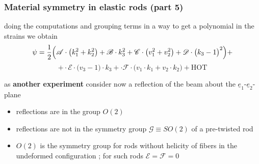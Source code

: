 \begin{frame}
  \frametitle{Material symmetry in elastic rods (part 5)}

  doing the computations and grouping terms in a way to get a polynomial in the strains we obtain
  \begin{displaymath}
    \psi =
    \frac{1}{2} \Bigl(
      \mathscr{A} \cdot \bigl( k_1^2 + k_2^2 \bigr) +
      \mathscr{B} \cdot k_3^2 +
      \mathscr{C} \cdot \bigl( v_1^2 + v_2^2 \bigr) +
      \mathscr{D} \cdot \bigl( k_3 - 1 \bigr)^2 \Bigr) +
  \end{displaymath}
  \begin{displaymath}
    + \cdot \mathscr{E} \cdot \bigl( v_3 - 1 \bigr) \cdot k_3 +
      \cdot \mathscr{F} \cdot \bigl( v_1 \cdot k_1 + v_2 \cdot k_2 \bigr)
    + \text{HOT}
  \end{displaymath}
  
  \vspace{1em}
  as \textbf{another experiment} consider now a reflection of the beam about the $\underline{e}_1$-$\underline{e}_2$-plane
  
  \vspace{0.3em}
  \begin{itemize}
    \item reflections are in the group $O(2)$
    \item reflections are not in the symmetry group $\mathscr{G} \equiv SO(2)$ of a pre-twisted rod
   \item $O(2)$ is the symmetry group for rods without helicity of fibers in the undeformed configuration ; for such rods $\mathscr{E} = \mathscr{F} = 0$ 
  \end{itemize}
 
\end{frame}



